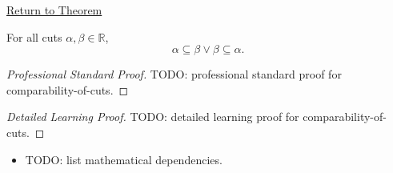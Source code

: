 \newpage
{}
\label{prf:comparability-of-cuts}

\begin{remark*}[Return]
\hyperref[thm:comparability-of-cuts]{Return to Theorem}
\end{remark*}

\begin{theorem*}
For all cuts $\alpha,\beta\in\mathbb{R}$,
\[
\alpha\subseteq\beta \lor \beta\subseteq\alpha.
\]
\end{theorem*}

\begin{proof}[Professional Standard Proof]
\LRAProofBodyStart
TODO: professional standard proof for comparability-of-cuts.
\end{proof}

\begin{proof}[Detailed Learning Proof]
\LRAProofBodyStart
TODO: detailed learning proof for comparability-of-cuts.
\end{proof}

\begin{remark*}
\end{remark*}

\begin{dependencies}
\begin{itemize}
  \item TODO: list mathematical dependencies.
\end{itemize}
\end{dependencies}

\clearpage
